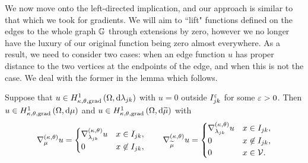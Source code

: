 We now move onto the left-directed implication, and our approach is similar to that which we took for gradients.
We will aim to ``lift" functions defined on the edges to the whole graph $\mathbb{G}$ through extensions by zero, however we no longer have the luxury of our original function being zero almost everywhere.
As a result, we need to consider two cases: when an edge function $u$ has proper distance to the two vertices at the endpoints of the edge, and when this is not the case.
We deal with the former in the lemma which follows.
\begin{lemma} \label{lem:ExtensionLemmaEdgeFunctions}
	Suppose that $u\in H^1_{\kappa,\theta,\mathrm{grad}}\left( \Omega, \mathrm{d}\lambda_{jk} \right)$ with $u=0$ outside $I_{jk}^\varepsilon$ for some $\varepsilon>0$.
	Then $u\in H^1_{\kappa,\theta,\mathrm{grad}}\left( \Omega, \mathrm{d}\mu \right)$ and $u\in H^1_{\kappa,\theta,\mathrm{grad}}\left( \Omega, \mathrm{d}\widetilde{\mu} \right)$ with
	\begin{align*}
		\nabla^{\left( \kappa, \theta \right)}_{\mu}u = 
		\begin{cases} 
			\nabla^{\left( \kappa, \theta \right)}_{\lambda_{jk}}u & x\in I_{jk}, \\
			0 & x\not\in I_{jk}, 
		\end{cases}
		\qquad
		\nabla^{\left( \kappa, \theta \right)}_{\widetilde{\mu}}u = 
		\begin{cases} 
			\nabla^{\left( \kappa, \theta \right)}_{\lambda_{jk}}u & x\in I_{jk}, \\
			0 & x\not\in I_{jk}, \\
			0 & x\in\mathcal{V}.
		\end{cases}
	\end{align*}
\end{lemma}
